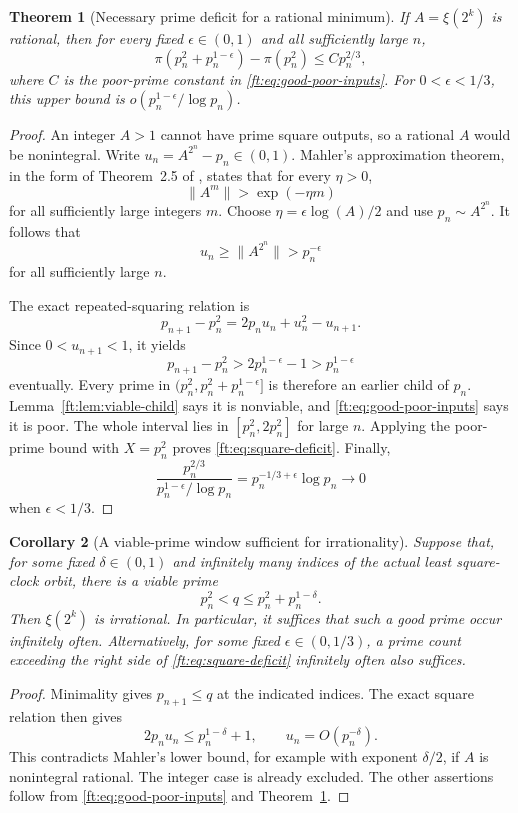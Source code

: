 \documentclass[11pt,a4paper]{article}
\newtheorem{theorem}{Theorem}[section]
\newtheorem{corollary}[theorem]{Corollary}
\theoremstyle{definition}
\theoremstyle{remark}
\numberwithin{equation}{section}
\begin{document}
\begin{theorem}[Necessary prime deficit for a rational minimum]
\label{ft:thm:square-deficit}
If $A=\xi(2^k)$ is rational, then for every fixed $\epsilon\in(0,1)$
and all sufficiently large $n$,
\begin{equation}
\label{ft:eq:square-deficit}
 \pi(p_n^2+p_n^{1-\epsilon})-\pi(p_n^2)
 \le C p_n^{2/3},
\end{equation}
where $C$ is the poor-prime constant in
\eqref{ft:eq:good-poor-inputs}. For $0<\epsilon<1/3$, this upper bound
is $o(p_n^{1-\epsilon}/\log p_n)$.
\end{theorem}
\begin{proof}
An integer $A>1$ cannot have prime square outputs, so a rational $A$
would be nonintegral. Write $u_n=A^{2^n}-p_n\in(0,1)$.
Mahler's approximation theorem, in the form of Theorem~2.5 of
\cite{SaitoMills}, states that for every $\eta>0$,
\[
 \|A^m\|>\exp(-\eta m)
\]
for all sufficiently large integers $m$. Choose
$\eta=\epsilon\log(A)/2$ and use $p_n\sim A^{2^n}$. It follows that
\[
 u_n\ge\|A^{2^n}\|>p_n^{-\epsilon}
\]
for all sufficiently large $n$.

The exact repeated-squaring relation is
\[
 p_{n+1}-p_n^2=2p_nu_n+u_n^2-u_{n+1}.
\]
Since $0<u_{n+1}<1$, it yields
\[
 p_{n+1}-p_n^2>2p_n^{1-\epsilon}-1>p_n^{1-\epsilon}
\]
eventually. Every prime in
$(p_n^2,p_n^2+p_n^{1-\epsilon}]$ is therefore an earlier child of
$p_n$. Lemma~\ref{ft:lem:viable-child} says it is nonviable, and
\eqref{ft:eq:good-poor-inputs} says it is poor. The whole interval
lies in $[p_n^2,2p_n^2]$ for large $n$. Applying the poor-prime bound
with $X=p_n^2$ proves \eqref{ft:eq:square-deficit}.
Finally,
\[
 \frac{p_n^{2/3}}{p_n^{1-\epsilon}/\log p_n}
 =p_n^{-1/3+\epsilon}\log p_n\longrightarrow0
\]
when $\epsilon<1/3$.
\end{proof}

\begin{corollary}[A viable-prime window sufficient for irrationality]
\label{ft:cor:square-window}
Suppose that, for some fixed $\delta\in(0,1)$ and infinitely many
indices of the actual least square-clock orbit, there is a viable prime
\[
 p_n^2<q\le p_n^2+p_n^{1-\delta}.
\]
Then $\xi(2^k)$ is irrational. In particular, it suffices that such
a good prime occur infinitely often. Alternatively, for some fixed
$\epsilon\in(0,1/3)$, a prime count exceeding the right side of
\eqref{ft:eq:square-deficit} infinitely often also suffices.
\end{corollary}
\begin{proof}
Minimality gives $p_{n+1}\le q$ at the indicated indices. The exact
square relation then gives
\[
 2p_nu_n\le p_n^{1-\delta}+1,
 \qquad u_n=O(p_n^{-\delta}).
\]
This contradicts Mahler's lower bound, for example with exponent
$\delta/2$, if $A$ is nonintegral rational. The integer case is
already excluded. The other assertions follow from
\eqref{ft:eq:good-poor-inputs} and Theorem~\ref{ft:thm:square-deficit}.
\end{proof}
\end{document}

